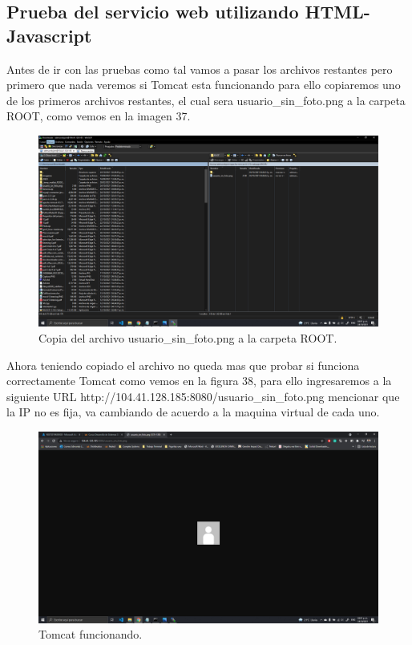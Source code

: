 \documentclass[11pt]{article}
\begin{document}
		\subsection{Prueba del servicio web utilizando HTML-Javascript}
		Antes de ir con las pruebas como tal vamos a pasar los archivos restantes pero primero que nada veremos si Tomcat esta funcionando para ello copiaremos uno de los primeros archivos restantes, el cual sera usuario\_sin\_foto.png a la carpeta ROOT, como vemos en la imagen 37.
		\begin{figure}[H]
			\centering
			\includegraphics[scale=0.34]{resources/ULTIMO1.png}
			\caption{Copia del archivo usuario\_sin\_foto.png a la carpeta ROOT.}\label{fig:picture}
		\end{figure}
		 Ahora teniendo copiado el archivo no queda mas que probar si funciona correctamente Tomcat como vemos en la figura 38, para ello ingresaremos a la siguiente URL http://104.41.128.185:8080/usuario\_sin\_foto.png mencionar que la IP no es fija, va cambiando de acuerdo a la maquina virtual de cada uno.
		\begin{figure}[H]
			\centering
			\includegraphics[scale=0.34]{resources/ULTIMO1ok.png}
			\caption{Tomcat funcionando.}\label{fig:picture}
		\end{figure}		 
\end{document}

